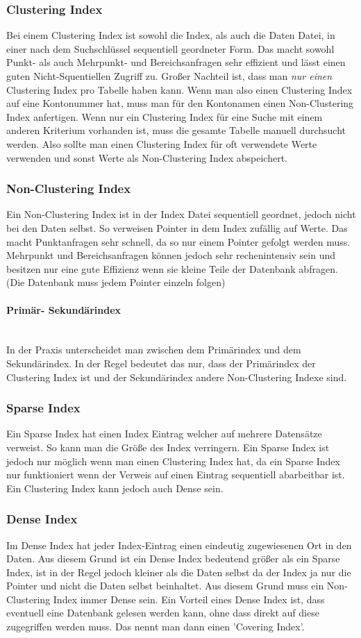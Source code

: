 \documentclass{article}
\newcommand{\paragraphlb}[1]{\paragraph{#1}\mbox{}\\}
\begin{document}
	\subsubsection{Clustering Index}
	Bei einem Clustering Index ist sowohl die Index, als auch die Daten Datei, in einer nach dem Suchschlüssel sequentiell geordneter Form. Das macht sowohl Punkt- als auch Mehrpunkt- und Bereichsanfragen sehr effizient und lässt einen guten Nicht-Squentiellen Zugriff zu. Großer Nachteil ist, dass man \textit{nur einen} Clustering Index pro Tabelle haben kann. Wenn man also einen Clustering Index auf eine Kontonummer hat, muss man für den Kontonamen einen Non-Clustering Index anfertigen. Wenn nur ein Clustering Index für eine Suche mit einem anderen Kriterium vorhanden ist, muss die gesamte Tabelle manuell durchsucht werden. Also sollte man einen Clustering Index für oft verwendete Werte verwenden und sonst Werte als Non-Clustering Index abspeichert.
	\subsubsection{Non-Clustering Index}
	Ein Non-Clustering Index ist in der Index Datei sequentiell geordnet, jedoch nicht bei den Daten selbst. So verweisen Pointer in dem Index zufällig auf Werte. Das macht Punktanfragen sehr schnell, da so nur einem Pointer gefolgt werden muss. Mehrpunkt und Bereichsanfragen können jedoch sehr rechenintensiv sein und besitzen nur eine gute Effizienz wenn sie kleine Teile der Datenbank abfragen. (Die Datenbank muss jedem Pointer einzeln folgen)
	\paragraphlb{Primär- Sekundärindex}
	In der Praxis unterscheidet man zwischen dem Primärindex und dem Sekundärindex. In der Regel bedeutet das nur, dass der Primärindex der Clustering Index ist und der Sekundärindex andere Non-Clustering Indexe sind.
	\subsubsection{Sparse Index}
	Ein Sparse Index hat einen Index Eintrag welcher auf mehrere Datensätze verweist. So kann man die Größe des Index verringern. Ein Sparse Index ist jedoch nur möglich wenn man einen Clustering Index hat, da ein Sparse Index nur funktioniert wenn der Verweis auf einen Eintrag sequentiell abarbeitbar ist. Ein Clustering Index kann jedoch auch Dense sein.
	\subsubsection{Dense Index}
	Im Dense Index hat jeder Index-Eintrag einen eindeutig zugewiesenen Ort in den Daten. Aus diesem Grund ist ein Dense Index bedeutend größer als ein Sparse Index, ist in der Regel jedoch kleiner als die Daten selbst da der Index ja nur die Pointer und nicht die Daten selbst beinhaltet. Aus diesem Grund muss ein Non-Clustering Index immer Dense sein. Ein Vorteil eines Dense Index ist, dass eventuell eine Datenbank gelesen werden kann, ohne dass direkt auf diese zugegriffen werden muss. Das nennt man dann einen 'Covering Index'. \\
\end{document}
